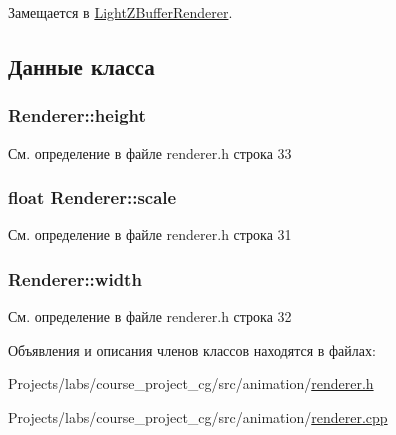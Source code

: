 Замещается в \hyperlink{class_light_z_buffer_renderer_a431be9dc219e4d2706c95ada2aca8af6}{Light\+Z\+Buffer\+Renderer}.



\subsection{Данные класса}
\subsubsection[{\texorpdfstring{height}{height}}]{ Renderer\+::height\hspace{0.3cm}{\ttfamily [protected]}}\hypertarget{class_renderer_ab2e154b790a2d31603f147510c261ac2}{}\label{class_renderer_ab2e154b790a2d31603f147510c261ac2}


См. определение в файле renderer.\+h строка 33

\subsubsection[{\texorpdfstring{scale}{scale}}]{\setlength{\rightskip}{0pt plus 5cm}float Renderer\+::scale\hspace{0.3cm}{\ttfamily [protected]}}\hypertarget{class_renderer_aeab228a83d206c55fc73c7a14a0f0761}{}\label{class_renderer_aeab228a83d206c55fc73c7a14a0f0761}


См. определение в файле renderer.\+h строка 31

\subsubsection[{\texorpdfstring{width}{width}}]{ Renderer\+::width\hspace{0.3cm}{\ttfamily [protected]}}\hypertarget{class_renderer_ada813defebef120813571bfb6053e88f}{}\label{class_renderer_ada813defebef120813571bfb6053e88f}


См. определение в файле renderer.\+h строка 32



Объявления и описания членов классов находятся в файлах\+:\begin{DoxyCompactItemize}
\item 
Projects/labs/course\+\_\+project\+\_\+cg/src/animation/\hyperlink{renderer_8h}{renderer.\+h}\item 
Projects/labs/course\+\_\+project\+\_\+cg/src/animation/\hyperlink{renderer_8cpp}{renderer.\+cpp}\end{DoxyCompactItemize}
